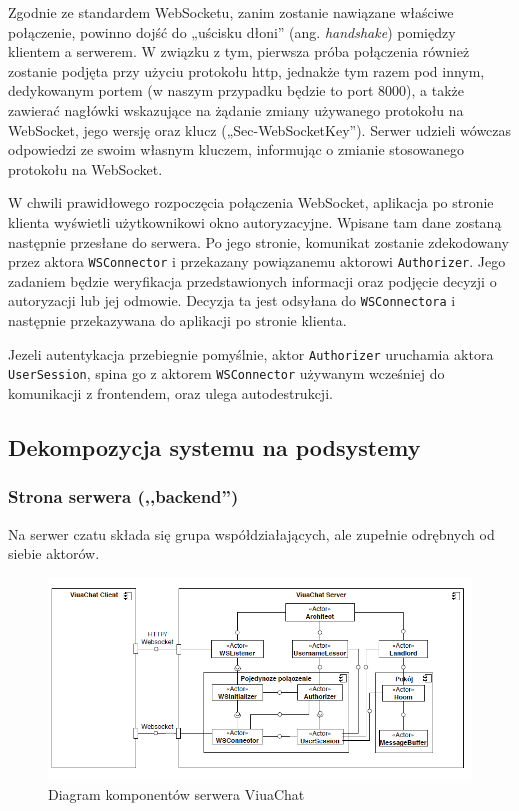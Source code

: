 Zgodnie ze standardem WebSocketu, zanim zostanie nawiązane właściwe połączenie,
powinno dojść do „uścisku dłoni” (ang. \textit{handshake}) pomiędzy klientem a
serwerem. W związku z tym, pierwsza próba połączenia również zostanie podjęta
przy użyciu protokołu http, jednakże tym razem pod innym, dedykowanym portem
(w naszym przypadku będzie to port 8000), a także zawierać nagłówki wskazujące
na żądanie zmiany używanego protokołu na WebSocket, jego wersję oraz klucz
(„Sec-WebSocketKey”). Serwer udzieli wówczas odpowiedzi ze swoim własnym
kluczem, informując o zmianie stosowanego protokołu na WebSocket.

W chwili prawidłowego rozpoczęcia połączenia WebSocket, aplikacja po stronie
klienta wyświetli użytkownikowi okno autoryzacyjne. Wpisane tam dane zostaną
następnie przesłane do serwera. Po jego stronie, komunikat zostanie zdekodowany
przez aktora \texttt{WSConnector} i przekazany powiązanemu aktorowi
\texttt{Authorizer}. Jego zadaniem będzie weryfikacja przedstawionych informacji
oraz podjęcie decyzji o autoryzacji lub jej odmowie. Decyzja ta jest odsyłana do
\texttt{WSConnectora} i następnie przekazywana do aplikacji po stronie klienta.

Jezeli autentykacja przebiegnie pomyślnie, aktor \texttt{Authorizer} uruchamia
aktora \texttt{UserSession}, spina go z aktorem \texttt{WSConnector} używanym
wcześniej do komunikacji z frontendem, oraz ulega autodestrukcji.

\newpage

\subsection{Dekompozycja systemu na podsystemy}
\label{architektura_chatu}

\subsubsection{Strona serwera (,,backend'')}
Na serwer czatu składa się grupa współdziałających, ale zupełnie odrębnych od siebie aktorów.

\begin{figure}[!htp]
	\centering
	\includegraphics[width=\textwidth]{chat/fig/pck-diag}
	\caption{Diagram komponentów serwera ViuaChat}
	\label{diag-komp}
\end{figure}


